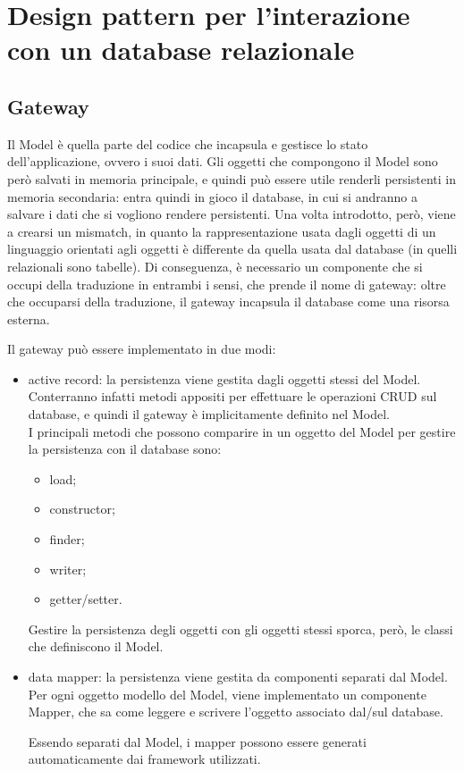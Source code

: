 \chapter{Design pattern per l'interazione con un database relazionale}
\section{Gateway}
Il Model è quella parte del codice che incapsula e gestisce lo stato dell'applicazione, ovvero i suoi dati.
Gli oggetti che compongono il Model sono però salvati in memoria principale, e quindi può essere utile renderli persistenti in memoria secondaria: entra quindi in gioco il database, in cui si andranno a salvare i dati che si vogliono rendere persistenti.
Una volta introdotto, però, viene a crearsi un mismatch, in quanto la rappresentazione usata dagli oggetti di un linguaggio orientati agli oggetti è differente da quella usata dal database (in quelli relazionali sono tabelle). Di conseguenza, è necessario un componente che si occupi della traduzione in entrambi i sensi, che prende il nome di gateway: oltre che occuparsi della traduzione, il gateway incapsula il database come una risorsa esterna.

Il gateway può essere implementato in due modi:
\begin{itemize}
    \item active record: la persistenza viene gestita dagli oggetti stessi del Model. Conterranno infatti metodi appositi per effettuare le operazioni CRUD sul database, e quindi il gateway è implicitamente definito nel Model.\\
    I principali metodi che possono comparire in un oggetto del Model per gestire la persistenza con il database sono:
    \begin{itemize}
        \item load;
        \item constructor;
        \item finder;
        \item writer;
        \item getter/setter.
    \end{itemize}
    Gestire la persistenza degli oggetti con gli oggetti stessi sporca, però, le classi che definiscono il Model.
    \item data mapper: la persistenza viene gestita da componenti separati dal Model.
    Per ogni oggetto modello del Model, viene implementato un componente Mapper, che sa come leggere e scrivere l'oggetto associato dal/sul database.

    Essendo separati dal Model, i mapper possono essere generati automaticamente dai framework utilizzati.
\end{itemize}

